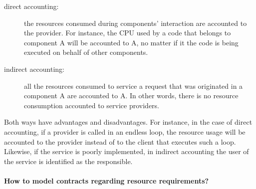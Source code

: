 \begin{description}
\item[direct accounting:] the resources consumed during
components' interaction are accounted to the provider.
For instance, the CPU used by a code that belongs
to component A will be accounted to A, no matter if it the code is being executed on behalf of other components.

\item[indirect accounting:] all the resources consumed to service a request that was originated in a component A are accounted to A.
In other words, there is no resource consumption accounted to service providers.
\end{description}

Both ways have advantages and disadvantages.
For instance, in the case of direct accounting, if a provider is
called in an endless loop, the resource usage will be accounted
to the provider instead of to the client that executes such a loop.
Likewise, if the service is poorly implemented, in indirect accounting the user of the service is identified as the responsible.

\paragraph{How to model contracts regarding resource requirements?}

